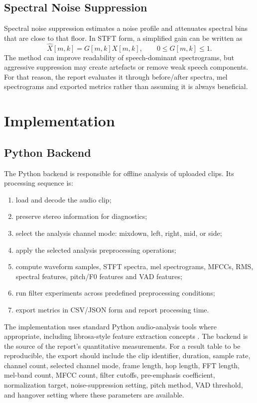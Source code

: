 ﻿\documentclass[11pt,a4paper]{article}
\begin{document}
\subsection{Spectral Noise Suppression}
Spectral noise suppression estimates a noise profile and attenuates spectral bins that are close to that floor. In STFT form, a simplified gain can be written as
\begin{equation}
    \hat{X}[m,k] = G[m,k]X[m,k], \qquad 0 \leq G[m,k] \leq 1.
\end{equation}
The method can improve readability of speech-dominant spectrograms, but aggressive suppression may create artefacts or remove weak speech components. For that reason, the report evaluates it through before/after spectra, mel spectrograms and exported metrics rather than assuming it is always beneficial.

\section{Implementation}
\subsection{Python Backend}
The Python backend is responsible for offline analysis of uploaded clips. Its processing sequence is:
\begin{enumerate}
    \item load and decode the audio clip;
    \item preserve stereo information for diagnostics;
    \item select the analysis channel mode: mixdown, left, right, mid, or side;
    \item apply the selected analysis preprocessing operations;
    \item compute waveform samples, STFT spectra, mel spectrograms, MFCCs, RMS, spectral features, pitch/F0 features and VAD features;
    \item run filter experiments across predefined preprocessing conditions;
    \item export metrics in CSV/JSON form and report processing time.
\end{enumerate}
The implementation uses standard Python audio-analysis tools where appropriate, including librosa-style feature extraction concepts \citep{mcfee2015librosa}. The backend is the source of the report's quantitative measurements. For a result table to be reproducible, the export should include the clip identifier, duration, sample rate, channel count, selected channel mode, frame length, hop length, FFT length, mel-band count, MFCC count, filter cutoffs, pre-emphasis coefficient, normalization target, noise-suppression setting, pitch method, VAD threshold, and hangover setting where these parameters are available.
\end{document}
